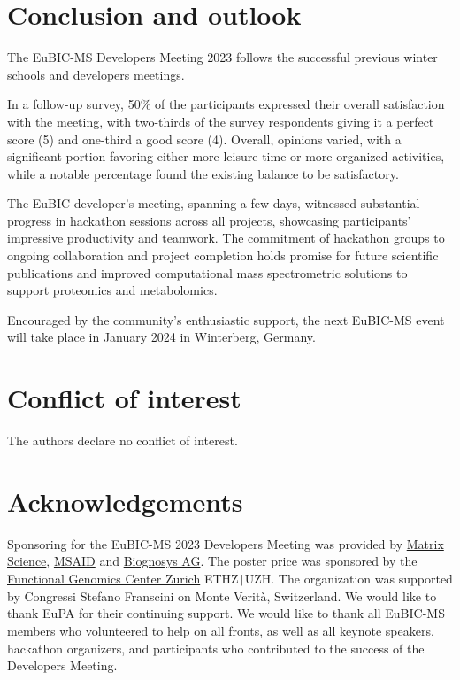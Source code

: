 \section{Conclusion and outlook}
The EuBIC-MS Developers Meeting 2023 follows the successful previous winter schools and developers meetings.

In a follow-up survey, 50\% of the participants expressed their overall satisfaction with the meeting, with two-thirds of the survey respondents giving it a perfect score (5) and one-third a good score (4).
Overall, opinions varied, with a significant portion favoring either more leisure time or more organized activities, while a notable percentage found the existing balance to be satisfactory.
    
The EuBIC developer's meeting, spanning a few days, witnessed substantial progress in hackathon sessions across all projects, showcasing participants' impressive productivity and teamwork. The commitment of hackathon groups to ongoing collaboration and project completion holds promise for future scientific publications and improved computational mass spectrometric solutions to support proteomics and metabolomics.

Encouraged by the community's enthusiastic support, the next EuBIC-MS event will take place in January 2024 in Winterberg, Germany.
 
\section{Conflict of interest}
The authors declare no conflict of interest.
 
\section{Acknowledgements}
Sponsoring for the EuBIC-MS 2023 Developers Meeting was provided by \href{https://www.matrixscience.com/}{Matrix Science}, \href{https://www.msaid.de/}{MSAID} and \href{https://biognosys.com/}{Biognosys AG}. The poster price was sponsored by the \href{https://fgcz.ch}{Functional Genomics Center Zurich} ETHZ\texttt{|}UZH. The organization was supported by Congressi Stefano Franscini on Monte Verità, Switzerland. We would like to thank EuPA for their continuing support. We would like to thank all EuBIC-MS members who volunteered to help on all fronts, as well as all keynote speakers, hackathon organizers, and participants who contributed to the success of the Developers Meeting.

